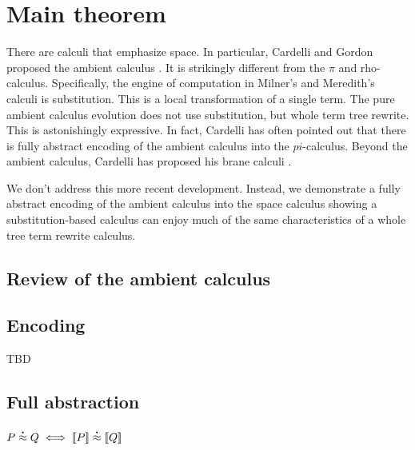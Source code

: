 \section{Main theorem}
There are calculi that emphasize space. In particular, Cardelli and
Gordon proposed the ambient calculus \cite{DBLP:journals/entcs/CardelliG97}. It is strikingly different from
the $\pi$ and rho-calculus. Specifically, the engine of computation in
Milner's and Meredith's calculi is substitution. This is a local
transformation of a single term. The pure ambient calculus evolution
does not use substitution, but whole term tree rewrite. This is
astonishingly expressive. In fact, Cardelli has often pointed out that
there is fully abstract encoding of the ambient calculus into the
$pi$-calculus. Beyond the ambient calculus, Cardelli has proposed his brane calculi \cite{DBLP:conf/cmsb/Cardelli04}.

We don't address this more recent development. Instead, we demonstrate
a fully abstract encoding of the ambient calculus into the space
calculus showing a substitution-based calculus can enjoy much of the same characteristics of a whole tree term rewrite calculus.

\subsection{Review of the ambient calculus}


\subsection{Encoding}

TBD

\subsection{Full abstraction}
\begin{theorem}
  $P \stackrel{\centerdot}{\approx} Q \iff [\![ P ]\!] \stackrel{\centerdot}{\approx} [\![ Q ]\!]$
\end{theorem}


